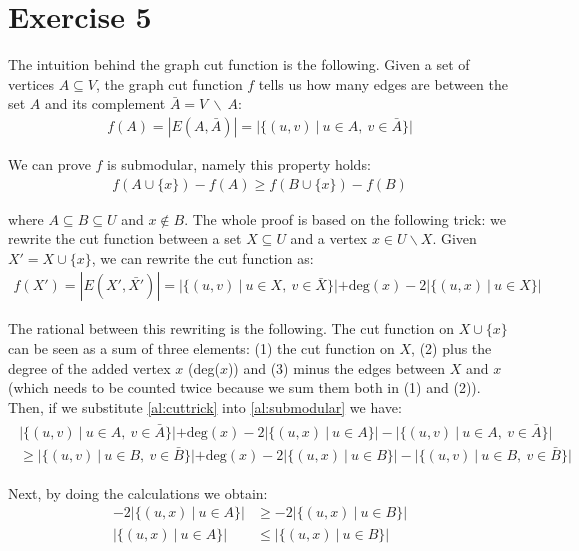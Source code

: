 \documentclass[12pt,a4paper]{article}
\begin{document}
\section*{Exercise 5}

The intuition behind the graph cut function is the following. Given a set of vertices $A \subseteq V$, the graph cut function $f$ tells us how many edges are between the set $A$ and its complement $\bar{A} = V\ \backslash\ A$:
\begin{align}\label{al:cutfun}
f(A) = |E(A, \bar{A})| = |\{(u, v)\ |\ u \in A,\  v \in \bar{A}\}|
\end{align}

We can prove $f$ is submodular, namely this property holds:
\begin{align}\label{al:submodular}
f(A \cup \{x\}) - f(A) \geq f(B \cup \{x\}) - f(B)
\end{align}

where $A \subseteq B \subseteq U$ and $x \not\in B$. The whole proof is based on the following trick: we rewrite the cut function between a set $X \subseteq U$ and a vertex $x \in U \backslash X$. Given $X' = X \cup \{x\}$, we can rewrite the cut function as:
\begin{align}\label{al:cuttrick}
f(X') = |E(X', \bar{X'})| = |\{(u, v)\ |\ u \in X,\  v \in \bar{X}\}| + \text{deg}(x) - 2 |\{(u, x)\ |\ u \in X\}|
\end{align}

The rational between this rewriting is the following. The cut function on $X \cup \{x\}$ can be seen as a sum of three elements: (1) the cut function on $X$, (2) plus the degree of the added vertex $x$ (deg($x$)) and (3) minus the edges between $X$ and $x$ (which needs to be counted twice because we sum them both in (1) and (2)). Then, if we substitute \eqref{al:cuttrick} into \eqref{al:submodular} we have:
\begin{align}
\begin{split}
|\{(u, v)\ |\ u \in A,\  v \in \bar{A}\}| + \text{deg}(x) - 2 |\{(u, x)\ |\ u \in A\}| - |\{(u, v)\ |\ u \in A,\  v \in \bar{A}\}|\\
\geq |\{(u, v)\ |\ u \in B,\  v \in \bar{B}\}| + \text{deg}(x) - 2 |\{(u, x)\ |\ u \in B\}| -  |\{(u, v)\ |\ u \in B,\  v \in \bar{B}\}|
\end{split}
\end{align}

Next, by doing the calculations we obtain:
\begin{align}
- 2 |\{(u, x)\ |\ u \in A\}| &\geq - 2 |\{(u, x)\ |\ u \in B\}|\\
|\{(u, x)\ |\ u \in A\}| &\leq |\{(u, x)\ |\ u \in B\}|\label{al:cutlast}
\end{align}
\end{document}
